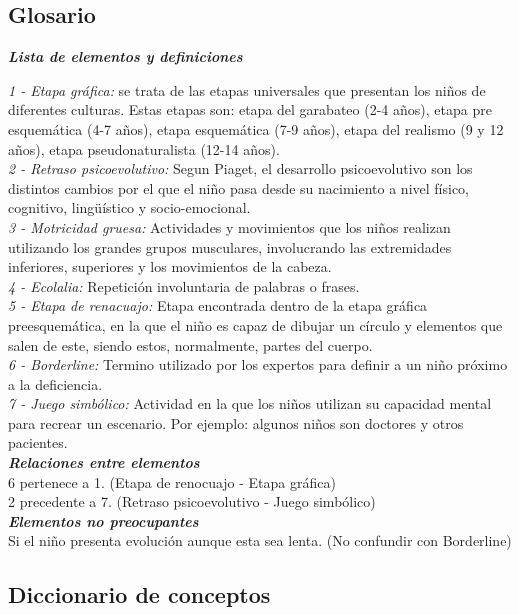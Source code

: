 \documentclass[letterpaper,12pt]{article}
\begin{document}
\subsection{Glosario}
\begin{flushleft}
\textbf{\textit{Lista de elementos y definiciones}}

\textit{1 - Etapa gráfica:} se trata de las etapas universales que presentan los niños de diferentes culturas. Estas etapas son: etapa del garabateo (2-4 años), etapa pre esquemática (4-7 años), etapa esquemática (7-9 años), etapa del realismo (9 y 12 años), etapa pseudonaturalista (12-14 años). \\
\textit{2 - Retraso psicoevolutivo: }Segun Piaget, el desarrollo psicoevolutivo son los distintos cambios por el que el niño pasa desde su nacimiento a nivel físico, cognitivo, lingüístico y socio-emocional. \\
\textit{3 - Motricidad gruesa:} Actividades y movimientos que los niños realizan utilizando los grandes grupos musculares, involucrando las extremidades inferiores, superiores y los movimientos de la cabeza. \\
\textit{4 - Ecolalia:} Repetición involuntaria de palabras o frases. \\
\textit{5 - Etapa de renacuajo:} Etapa encontrada dentro de la etapa gráfica preesquemática, en la que el niño es capaz de dibujar un círculo y elementos que salen de este, siendo estos, normalmente, partes del cuerpo. \\
\textit{6 - Borderline:} Termino utilizado por los expertos para definir a un niño próximo a la deficiencia.\\
\textit{7 - Juego simbólico:} Actividad en la que los niños utilizan su capacidad mental para recrear un escenario. Por ejemplo: algunos niños son doctores y otros pacientes.\\

\textbf{\textit{Relaciones entre elementos}}\\
6 pertenece a 1. (Etapa de renocuajo - Etapa gráfica) \\
2 precedente a 7. (Retraso psicoevolutivo - Juego simbólico)\\

\textbf{\textit{Elementos no preocupantes}} \\
Si el niño presenta evolución aunque esta sea lenta. (No confundir con
Borderline) \\
\end{flushleft}
\subsection{Diccionario de conceptos}
\end{document}
